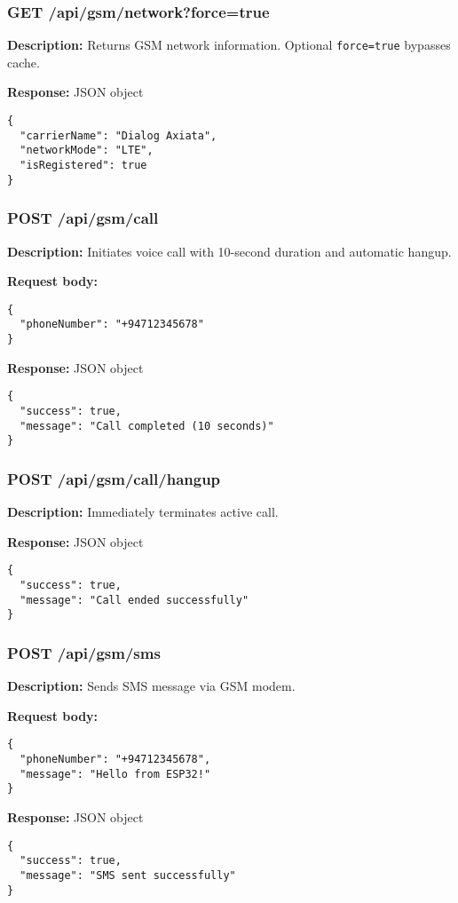\documentclass[11pt,a4paper]{article}
\begin{document}
\subsubsection{GET /api/gsm/network?force=true}
\textbf{Description:} Returns GSM network information. Optional \texttt{force=true} bypasses cache.

\textbf{Response:} JSON object
\begin{verbatim}
{
  "carrierName": "Dialog Axiata",
  "networkMode": "LTE",
  "isRegistered": true
}
\end{verbatim}

\subsubsection{POST /api/gsm/call}
\textbf{Description:} Initiates voice call with 10-second duration and automatic hangup.

\textbf{Request body:}
\begin{verbatim}
{
  "phoneNumber": "+94712345678"
}
\end{verbatim}

\textbf{Response:} JSON object
\begin{verbatim}
{
  "success": true,
  "message": "Call completed (10 seconds)"
}
\end{verbatim}

\subsubsection{POST /api/gsm/call/hangup}
\textbf{Description:} Immediately terminates active call.

\textbf{Response:} JSON object
\begin{verbatim}
{
  "success": true,
  "message": "Call ended successfully"
}
\end{verbatim}

\subsubsection{POST /api/gsm/sms}
\textbf{Description:} Sends SMS message via GSM modem.

\textbf{Request body:}
\begin{verbatim}
{
  "phoneNumber": "+94712345678",
  "message": "Hello from ESP32!"
}
\end{verbatim}

\textbf{Response:} JSON object
\begin{verbatim}
{
  "success": true,
  "message": "SMS sent successfully"
}
\end{verbatim}
\end{document}
